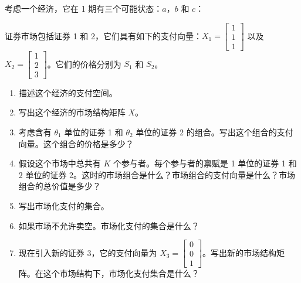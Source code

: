 \begin{problem}
 考虑一个经济，它在 1 期有三个可能状态：$a$，$b$ 和 $c$：
\begin{center}
\end{center}
证券市场包括证券 1 和 2，它们具有如下的支付向量：$X_{1}=\begin{bmatrix}1 \\ 1 \\ 1\end{bmatrix}$ 以及 $X_{2}=\begin{bmatrix}1 \\ 2 \\ 3\end{bmatrix}$。它们的价格分别为 $S_{1}$ 和 $S_{2}$。
\begin{enumerate}[label=(\alph*)]
    \item 描述这个经济的支付空间。
    \item 写出这个经济的市场结构矩阵 $X$。
    \item 考虑含有 $\theta_{1}$ 单位的证券 1 和 $\theta_{2}$ 单位的证券 2 的组合。写出这个组合的支付向量。这个组合的价格是多少？
    \item 假设这个市场中总共有 $K$ 个参与者。每个参与者的禀赋是 1 单位的证券 1 和 2 单位的证券 2。这时的市场组合是什么？市场组合的支付向量是什么？市场组合的总价值是多少？
    \item 写出市场化支付的集合。
    \item 如果市场不允许卖空。市场化支付的集合是什么？
    \item 现在引入新的证券 3，它的支付向量为 $X_{3}=\begin{bmatrix}0 \\ 0 \\ 1\end{bmatrix}$。写出新的市场结构矩阵。在这个市场结构下，市场化支付集合是什么？
\end{enumerate}
\end{problem}
